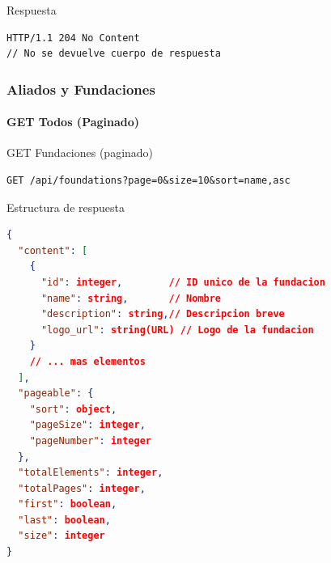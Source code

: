 \documentclass[11pt,a4paper]{article}
\begin{document}
\begin{center}
	\begin{minipage}{\textwidth}
		\begin{codebox}{Respuesta}
			\begin{lstlisting}[language=HTTP]
HTTP/1.1 204 No Content
// No se devuelve cuerpo de respuesta
\end{lstlisting}
		\end{codebox}
	\end{minipage}
\end{center}


\subsubsection{Aliados y Fundaciones}
\paragraph{GET Todos (Paginado)}

\begin{center}
	\begin{minipage}{\textwidth}
		\begin{codebox}{GET Fundaciones (paginado)}
			\begin{lstlisting}[language=HTTP]
GET /api/foundations?page=0&size=10&sort=name,asc
\end{lstlisting}
		\end{codebox}
	\end{minipage}
\end{center}

\begin{center}
	\begin{minipage}{\textwidth}
		\begin{codebox}{Estructura de respuesta}
			\begin{lstlisting}[language=json]
{
  "content": [
    {
      "id": integer,        // ID unico de la fundacion
      "name": string,       // Nombre
      "description": string,// Descripcion breve
      "logo_url": string(URL) // Logo de la fundacion
    }
    // ... mas elementos
  ],
  "pageable": {
    "sort": object,
    "pageSize": integer,
    "pageNumber": integer
  },
  "totalElements": integer,
  "totalPages": integer,
  "first": boolean,
  "last": boolean,
  "size": integer
}
\end{lstlisting}
		\end{codebox}
	\end{minipage}
\end{center}
\end{document}
